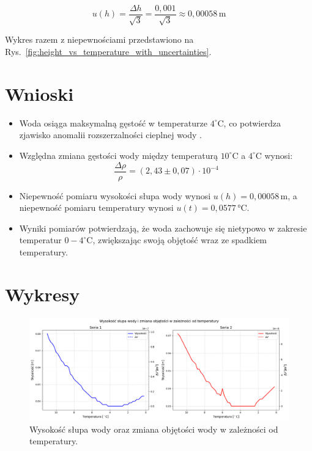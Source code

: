 \documentclass[a4paper,12pt]{article}
\begin{document}
\begin{equation}
    u(h) = \frac{\Delta h}{\sqrt{3}} = \frac{0{,}001}{\sqrt{3}} \approx 0{,}00058\,\text{m}
\end{equation}

Wykres razem z niepewnościami przedstawiono na Rys.~\ref{fig:height_vs_temperature_with_uncertainties}.

\section{Wnioski}

\begin{itemize}
    \item Woda osiąga maksymalną gęstość w temperaturze $4^\circ$C, co potwierdza zjawisko anomalii rozszerzalności cieplnej wody \cite{fizyka_dla_szkół_wyższych_tom_2}.

    \item Względna zmiana gęstości wody między temperaturą $10^\circ$C a $4^\circ$C wynosi:
          \[
              \frac{\Delta \rho}{\rho} = (2{,}43 \pm 0{,}07) \cdot 10^{-4}
          \]

    \item Niepewność pomiaru wysokości słupa wody wynosi $u(h) = 0{,}00058\,\text{m}$, a niepewność pomiaru temperatury wynosi $u(t) = 0{,}0577\,\text{°C}$.

    \item Wyniki pomiarów potwierdzają, że woda zachowuje się nietypowo w zakresie temperatur $0-4^\circ$C, zwiększając swoją objętość wraz ze spadkiem temperatury.
\end{itemize}

\newpage
\section{Wykresy}

\begin{figure}[H]
    \centering
    \includegraphics[width=0.9\textheight,angle=90]{height_vs_temperature.png}
    \caption{Wysokość słupa wody oraz zmiana objętości wody w zależności od temperatury.}
    \label{fig:height_vs_temperature}
\end{figure}
\end{document}
